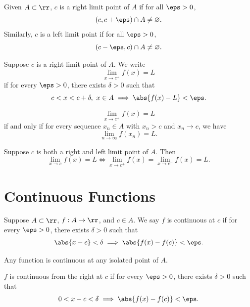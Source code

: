 \begin{definition}
    Given $A\subset\rr$, $c$ is a right limit point of $A$ if for all $\eps > 0$,
    \[
        (c, c+\eps)\cap A\neq\varnothing.
    \]
    Similarly, $c$ is a left limit point if for all $\eps > 0$,
    \[
        (c-\eps,c)\cap A\neq\varnothing.
    \]
\end{definition}

\begin{definition}
    Suppose $c$ is a right limit point of $A$.
    We write
    \[
        \lim_{x\to c^+}f(x) = L
    \]
    if for every $\eps > 0$, there exists $\delta > 0$ such that
    \[
        c < x < c + \delta,\ x\in A \implies \abs{f(x) - L} < \eps.
    \]
\end{definition}

\begin{proposition}
    \[
        \lim_{x\to c^+}f(x) = L
    \]
    if and only if for every sequence $x_n\in A$ with $x_n > c$ and $x_n\to c$, we have
    \[
        \lim_{n\to\infty} f(x_n) = L.
    \]
\end{proposition}

\begin{proposition}
    Suppose $c$ is both a right and left limit point of $A$.
    Then
    \[
        \lim_{x\to c}f(x) = L \iff \lim_{x\to c^+} f(x)= \lim_{x\to c^-}f(x) = L.
    \]
\end{proposition}

\section{Continuous Functions}

\begin{definition}[Continuous]
    Suppose $A\subset\rr$, $f:A\to \rr$, and $c\in A$.
    We say $f$ is continuous at $c$ if for every $\eps > 0$, there exists $\delta > 0$ such that
    \[
        \abs{x - c} < \delta \implies \abs{f(x) - f(c)} < \eps.
    \]
\end{definition}

\begin{remark}
    Any function is continuous at any isolated point of $A$.
\end{remark}

\begin{definition}
    $f$ is continuous from the right at $c$ if for every $\eps > 0$, there exists $\delta > 0$ such that
    \[
        0 < x-c < \delta \implies \abs{f(x) - f(c)}<\eps.
    \]
\end{definition}

